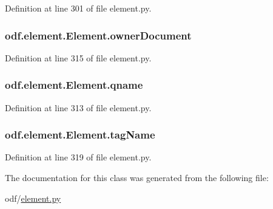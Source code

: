 Definition at line 301 of file element.\+py.

\hypertarget{classodf_1_1element_1_1Element_a3f5adc77e6ef8392e488e913de580b92}{
\subsubsection[{owner\+Document}]{\setlength{\rightskip}{0pt plus 5cm}odf.\+element.\+Element.\+owner\+Document}}\label{classodf_1_1element_1_1Element_a3f5adc77e6ef8392e488e913de580b92}


Definition at line 315 of file element.\+py.

\hypertarget{classodf_1_1element_1_1Element_af094fd4f65c213f17b319c152f8be830}{
\subsubsection[{qname}]{\setlength{\rightskip}{0pt plus 5cm}odf.\+element.\+Element.\+qname}}\label{classodf_1_1element_1_1Element_af094fd4f65c213f17b319c152f8be830}


Definition at line 313 of file element.\+py.

\hypertarget{classodf_1_1element_1_1Element_a95626c50cd66e61210673e949b86198f}{
\subsubsection[{tag\+Name}]{\setlength{\rightskip}{0pt plus 5cm}odf.\+element.\+Element.\+tag\+Name}}\label{classodf_1_1element_1_1Element_a95626c50cd66e61210673e949b86198f}


Definition at line 319 of file element.\+py.



The documentation for this class was generated from the following file\+:\begin{DoxyCompactItemize}
\item 
odf/\hyperlink{element_8py}{element.\+py}\end{DoxyCompactItemize}
